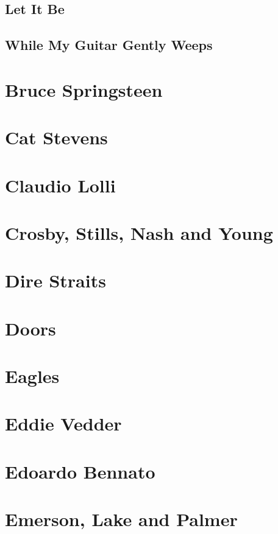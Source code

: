 \section{Let It Be}
\section{While My Guitar Gently Weeps}

\chapter{Bruce Springsteen}

\chapter{Cat Stevens}

\chapter{Claudio Lolli}

\chapter{Crosby, Stills, Nash and Young}

\chapter{Dire Straits}

\chapter{Doors}

\chapter{Eagles}

\chapter{Eddie Vedder}

\chapter{Edoardo Bennato}

\chapter{Emerson, Lake and Palmer}

